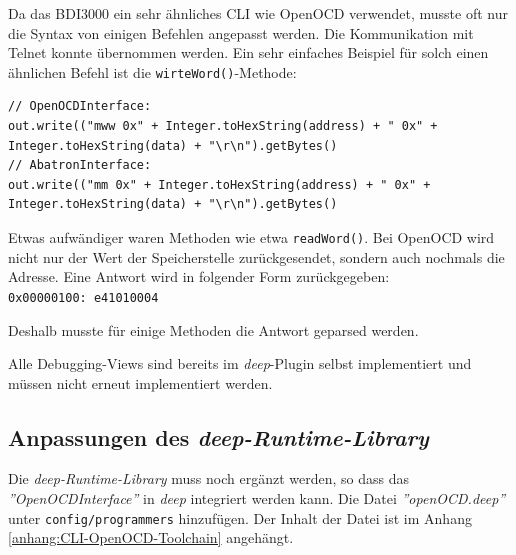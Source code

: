 Da das BDI3000 ein sehr ähnliches CLI wie OpenOCD verwendet, musste oft nur die Syntax von einigen Befehlen angepasst werden.
Die Kommunikation mit Telnet konnte übernommen werden.
Ein sehr einfaches Beispiel für solch einen ähnlichen Befehl ist die \texttt{wirteWord()}-Methode:

\lstset{language=java}
\begin{lstlisting}
// OpenOCDInterface:
out.write(("mww 0x" + Integer.toHexString(address) + " 0x" + Integer.toHexString(data) + "\r\n").getBytes()
// AbatronInterface:
out.write(("mm 0x" + Integer.toHexString(address) + " 0x" + Integer.toHexString(data) + "\r\n").getBytes()
\end{lstlisting}

Etwas aufwändiger waren Methoden wie etwa \texttt{readWord()}.
Bei OpenOCD wird nicht nur der Wert der Speicherstelle zurückgesendet, sondern auch nochmals die Adresse.
Eine Antwort wird in folgender Form zurückgegeben:\\
\texttt{0x00000100: e41010004}

Deshalb musste für einige Methoden die Antwort geparsed werden.

Alle Debugging-Views sind bereits im \textit{deep}-Plugin selbst implementiert und müssen nicht erneut implementiert werden. 



\subsection{Anpassungen des \textit{deep-Runtime-Library}}
Die \textit{deep-Runtime-Library} muss noch ergänzt werden, so dass das \textit{''OpenOCDInterface''} in \textit{deep} integriert werden kann.
Die Datei \textit{''openOCD.deep''} unter \texttt{config/programmers} hinzufügen.
Der Inhalt der Datei ist im Anhang \ref{anhang:CLI-OpenOCD-Toolchain} angehängt.


